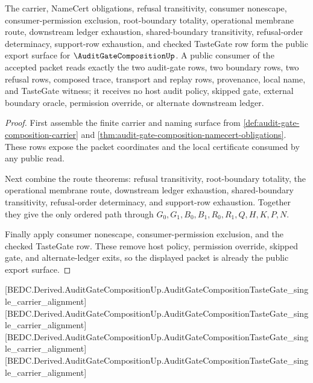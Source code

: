 \begin{theorem}
\label{thm:audit-gate-composition-public-export}
The carrier, NameCert obligations, refusal transitivity, consumer nonescape,
consumer-permission exclusion, root-boundary totality, operational membrane
route, downstream ledger exhaustion, shared-boundary transitivity,
refusal-order determinacy, support-row exhaustion, and checked TasteGate row
form the public export surface for $\AuditGateCompositionUp$. A public consumer
of the accepted packet reads exactly the two audit-gate rows, two boundary rows,
two refusal rows, composed trace, transport and replay rows, provenance, local
name, and TasteGate witness; it receives no host audit policy, skipped gate,
external boundary oracle, permission override, or alternate downstream ledger.
\end{theorem}
\begin{proof}
First assemble the finite carrier and naming surface from
\autoref{def:audit-gate-composition-carrier} and
\autoref{thm:audit-gate-composition-namecert-obligations}. These rows expose
the packet coordinates and the local certificate consumed by any public read.

Next combine the route theorems: refusal transitivity, root-boundary totality,
the operational membrane route, downstream ledger exhaustion, shared-boundary
transitivity, refusal-order determinacy, and support-row exhaustion. Together
they give the only ordered path through $G_0,G_1,B_0,B_1,R_0,R_1,Q,H,K,P,N$.

Finally apply consumer nonescape, consumer-permission exclusion, and the checked
TasteGate row. These remove host policy, permission override, skipped gate, and
alternate-ledger exits, so the displayed packet is already the public export
surface.
\end{proof}

[BEDC.Derived.AuditGateCompositionUp.AuditGateCompositionTasteGate\_single\_carrier\_alignment]
[BEDC.Derived.AuditGateCompositionUp.AuditGateCompositionTasteGate\_single\_carrier\_alignment]
[BEDC.Derived.AuditGateCompositionUp.AuditGateCompositionTasteGate\_single\_carrier\_alignment]
[BEDC.Derived.AuditGateCompositionUp.AuditGateCompositionTasteGate\_single\_carrier\_alignment]

